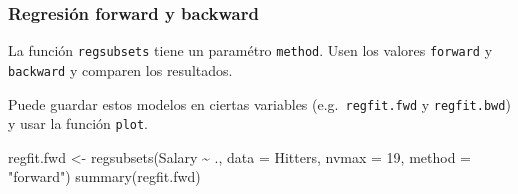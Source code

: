 \documentclass[
  12pt,
]{book}
\newenvironment{Shaded}{\begin{snugshade}}{\end{snugshade}}
\newcommand{\AttributeTok}[1]{\textcolor[rgb]{0.77,0.63,0.00}{#1}}
\newcommand{\DecValTok}[1]{\textcolor[rgb]{0.00,0.00,0.81}{#1}}
\newcommand{\FunctionTok}[1]{\textcolor[rgb]{0.00,0.00,0.00}{#1}}
\newcommand{\NormalTok}[1]{#1}
\newcommand{\OtherTok}[1]{\textcolor[rgb]{0.56,0.35,0.01}{#1}}
\newcommand{\SpecialCharTok}[1]{\textcolor[rgb]{0.00,0.00,0.00}{#1}}
\newcommand{\StringTok}[1]{\textcolor[rgb]{0.31,0.60,0.02}{#1}}
\theoremstyle{definition}
\theoremstyle{definition}
\theoremstyle{definition}
\theoremstyle{definition}
\theoremstyle{remark}
\begin{document}
\hypertarget{regresiuxf3n-forward-y-backward}{%
\subsubsection{Regresión forward y backward}\label{regresiuxf3n-forward-y-backward}}

La función \texttt{regsubsets} tiene un paramétro \texttt{method}. Usen los valores \texttt{forward} y \texttt{backward} y comparen los resultados.

Puede guardar estos modelos en ciertas variables (e.g.~\texttt{regfit.fwd} y \texttt{regfit.bwd}) y usar la función \texttt{plot}.

\begin{Shaded}
\begin{Highlighting}[]
\NormalTok{regfit.fwd }\OtherTok{\textless{}{-}} \FunctionTok{regsubsets}\NormalTok{(Salary }\SpecialCharTok{\textasciitilde{}}\NormalTok{ ., }\AttributeTok{data =}\NormalTok{ Hitters,}
    \AttributeTok{nvmax =} \DecValTok{19}\NormalTok{, }\AttributeTok{method =} \StringTok{"forward"}\NormalTok{)}
\FunctionTok{summary}\NormalTok{(regfit.fwd)}
\end{Highlighting}
\end{Shaded}
\end{document}
